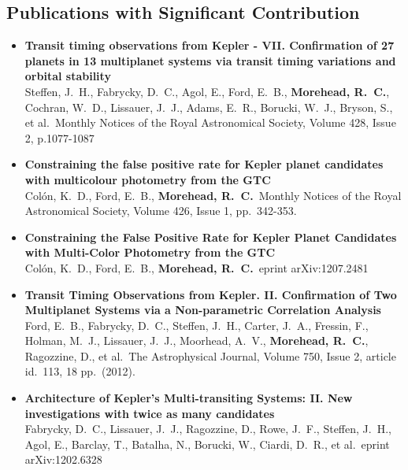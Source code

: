 \documentclass[12pt,letterpaper,sans]{moderncv} %
\begin{document}
\subsection{Publications with Significant Contribution}

\begin{itemize}
 \item \textbf{ Transit timing observations from Kepler - VII. Confirmation 
of 27 planets in 13 multiplanet systems via transit timing variations and 
orbital stability } \\ Steffen, J.~H., Fabrycky, D.~C., Agol, E., Ford, 
E.~B., \textbf{Morehead, R.~C.}, Cochran, W.~D., Lissauer, J.~J., Adams, E.~R., 
Borucki, W.~J., Bryson, S., et al.\ Monthly Notices of the Royal 
Astronomical Society, Volume 428, Issue 2, p.1077-1087 \\ 

 \item \textbf{ Constraining the false positive rate for Kepler planet 
candidates with multicolour photometry from the GTC } \\ Col{\'o}n, K.~D., 
Ford, E.~B., \textbf{Morehead, R.~C.}\ Monthly Notices of the Royal Astronomical 
Society, Volume 426, Issue 1, pp.~342-353.\ \\ 

 \item \textbf{ Constraining the False Positive Rate for Kepler Planet 
Candidates with Multi-Color Photometry from the GTC } \\ Col{\'o}n, K.~D., 
Ford, E.~B., \textbf{Morehead, R.~C.}\ eprint arXiv:1207.2481 \\ 

 \item \textbf{ Transit Timing Observations from Kepler. II. Confirmation 
of Two Multiplanet Systems via a Non-parametric Correlation Analysis } \\ 
Ford, E.~B., Fabrycky, D.~C., Steffen, J.~H., Carter, J.~A., Fressin, F., 
Holman, M.~J., Lissauer, J.~J., Moorhead, A.~V., \textbf{Morehead, R.~C.}, 
Ragozzine, D., et al.\ The Astrophysical Journal, Volume 750, Issue 2, 
article id.~113, 18 pp.~(2012).\ \\ 

 \item \textbf{ Architecture of Kepler's Multi-transiting Systems: II. New 
investigations with twice as many candidates } \\ Fabrycky, D.~C., 
Lissauer, J.~J., Ragozzine, D., Rowe, J.~F., Steffen, J.~H., Agol, E., 
Barclay, T., Batalha, N., Borucki, W., Ciardi, D.~R., et al.\ eprint 
arXiv:1202.6328 \\ 



\end{itemize}
\end{document}
